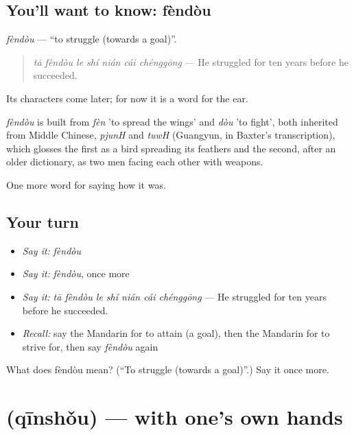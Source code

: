 \subsection*{You'll want to know: fèndòu}
\emph{fèndòu} — \textquotedblleft{}to struggle (towards a goal)\textquotedblright{}.

\begin{quote}
\emph{tā fèndòu le shí nián cái chénggōng} — He struggled for ten years before he succeeded.
\end{quote}

Its characters come later; for now it is a word for the ear.

\begin{cousinweb}
\emph{fèndòu} is built from \emph{fèn} 'to spread the wings' and \emph{dòu} 'to fight', both inherited from Middle Chinese, \emph{pjunH} and \emph{tuwH} (Guangyun, in Baxter's transcription), which glosses the first as a bird spreading its feathers and the second, after an older dictionary, as two men facing each other with weapons.
\end{cousinweb}

\begin{grammarlens}[title={What you've built}]
One more word for saying how it was.
\end{grammarlens}

\subsection*{Your turn}
\begin{itemize}
\raggedright
  \item \emph{Say it:} \emph{fèndòu}
  \item \emph{Say it:} \emph{fèndòu}, once more
  \item \emph{Say it:} \emph{tā fèndòu le shí nián cái chénggōng} — He struggled for ten years before he succeeded.
  \item \emph{Recall:} say the Mandarin for to attain (a goal), then the Mandarin for to strive for, then say \emph{fèndòu} again
\end{itemize}

\begin{tcolorbox}[breakable,colback=teal!4,colframe=teal!35!black,title={Before you move on}]
What does fèndòu mean? (\textquotedblleft{}To struggle (towards a goal)\textquotedblright{}.) Say it once more.
\end{tcolorbox}
\section[\texorpdfstring{\zh{亲手} (qīnshǒu)}{亲手 (qīnshǒu)}]{ (qīnshǒu) — with one's own hands}

